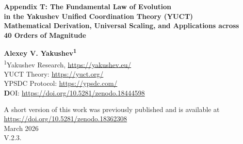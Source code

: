\documentclass[12pt,a4paper]{article}
\theoremstyle{remark}
\begin{document}
	
	\begin{titlepage}
		\begin{center}
			\vspace*{1cm}
			
			\Huge\textbf{Appendix T: The Fundamental Law of Evolution \\ in the Yakushev Unified Coordination Theory (YUCT)} \\
			\vspace{0.5cm}
			\Large\textbf{Mathematical Derivation, Universal Scaling, and Applications across 40 Orders of Magnitude}
			
			\vspace{1.5cm}
			
			\Large\textbf{Alexey V. Yakushev\textsuperscript{1}} \\
			
			
			\vspace{0.3cm}
			\large
			\textsuperscript{1}Yakushev Research, \url{https://yakushev.eu/} \\
						
			\vspace{1cm}
			\large
	YUCT Theory: \url{https://yuct.org/}\\
YPSDC Protocol: \url{https://ypsdc.com/}\\


\vspace{2cm}
\textbf DOI: \url{https://doi.org/10.5281/zenodo.18444598}\\

\vspace{1cm}

\vspace{0cm}
\large 
A short version of this work was previously published and is available at\\ \url{https://doi.org/10.5281/zenodo.18362308}\\
\vspace{1cm}
March 2026 \\ \large V.2.3.
			
			\vspace{2cm}
			

\end{center}
\end{titlepage}
\end{document}
